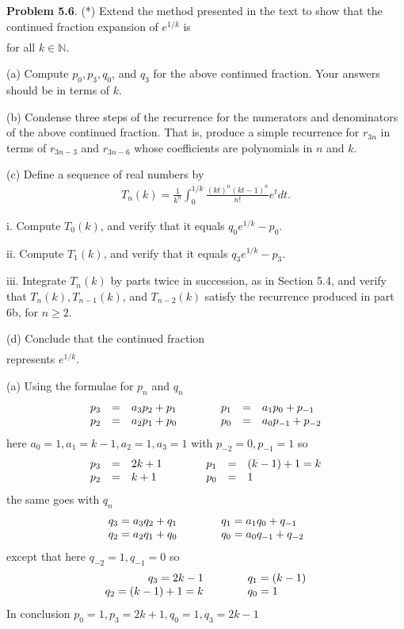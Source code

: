 \documentclass[aps,preprint,preprintnumbers,nofootinbib,showpacs,prd]{revtex4-1}
\newcommand{\nbea}{\begin{eqnarray*}}
\newcommand{\neea}{\end{eqnarray*}}
\begin{document}
{\bf Problem 5.6}. (*) Extend the method presented in the text to show that the continued fraction expansion of $e^{1/k}$ is
%
\nbea
[1, (k - 1), 1, 1, (3k - 1), 1, 1, (5k - 1), 1, 1, (7k - 1), \dots]
\neea
%
for all $k \in\mathbb{N}$.

(a) Compute $p_0 , p_3 , q_0$, and $q_3$ for the above continued fraction. Your answers should be in terms of $k$.

(b) Condense three steps of the recurrence for the numerators and denominators of the above continued fraction. That is, produce a simple recurrence for $r_{3n}$ in terms of $r_{3n-3}$ and $r_{3n-6}$ whose coefficients are polynomials in $n$ and $k$.

(c) Define a sequence of real numbers by
%
\nbea
T_n (k) = \frac{1}{k^n} \int_0^{1/k} \frac{(kt)^n (kt - 1)^n}{n!}e^tdt.
\neea
%

i. Compute $T_0 (k)$, and verify that it equals $q_0 e^{1/k} - p_0$.

ii. Compute $T_1 (k)$, and verify that it equals $q_3 e^{1/k} - p_3$.

iii. Integrate $T_n (k)$ by parts twice in succession, as in Section 5.4, and verify that $T_n (k), T_{n-1} (k)$, and $T_{n-2} (k)$ satisfy the recurrence produced in part 6b, for $n \ge 2$.

(d) Conclude that the continued fraction
%
\nbea
[1, (k - 1), 1, 1, (3k - 1), 1, 1, (5k - 1), 1, 1, (7k - 1), \dots]
\neea
%
represents $e^{1/k}$.

(a) Using the formulae for $p_n$ and $q_n$
%
\nbea
\begin{array}{r c l c r c l}
p_3 & = & a_3p_2 + p_1 & ~~~~~~ & p_1 & = & a_1p_0 + p_{-1}\\
p_2 & = & a_2p_1 + p_0 & ~~~~~~ & p_0 & = & a_0p_{-1} + p_{-2}
\end{array}
\neea
%
here $a_0 = 1, a_1 = k - 1, a_2 = 1, a_3 = 1$ with $p_{-2} = 0, p_{-1} = 1$ so
%
\nbea
\begin{array}{r c l c r c l}
p_3 & = & 2k + 1 & ~~~~~~ & p_1 & = & (k-1) + 1 = k \\
p_2 & = & k + 1 & ~~~~~~ & p_0 & = & 1
\end{array}
\neea
%
the same goes with $q_n$
%
\nbea
\begin{array}{r c l c r c l}
q_3 = a_3q_2 + q_1 & ~~~~~~ & q_1 = a_1q_0 + q_{-1} \\
q_2 = a_2q_1 + q_0 & ~~~~~~ & q_0 = a_0q_{-1} + q_{-2}
\end{array}
\neea
%
except that here $q_{-2} = 1, q_{-1} = 0$ so
%
\nbea
\begin{array}{r c l c r c l}
q_3 = 2k - 1 & ~~~~~~ & q_1 = (k-1) \\
q_2 = (k-1) + 1 = k & ~~~~~~ & q_0 = 1
\end{array}
\neea
%
In conclusion $p_0 = 1, p_3 = 2k + 1, q_0 = 1, q_3 = 2k - 1$
\end{document}
